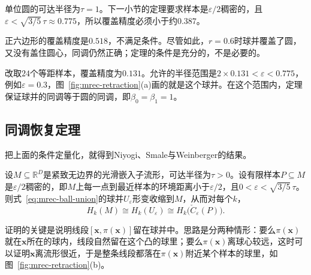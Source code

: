 单位圆的可达半径为$\tau=1$。下一小节的定理要求样本是$\varepsilon/2$稠密的，且$\varepsilon<\sqrt{3/5}\,\tau\approx0.775$，所以覆盖精度必须小于约$0.387$。

正六边形的覆盖精度是$0.518$，不满足条件。尽管如此，$r=0.6$时球并覆盖了圆，又没有盖住圆心，同调仍然正确；定理的条件是充分的，不是必要的。

改取$24$个等距样本，覆盖精度为$0.131$。允许的半径范围是$2\times0.131<\varepsilon<0.775$，例如$\varepsilon=0.3$，图~\ref{fig:mrec-retraction}(a)画的就是这个球并。在这个范围内，定理保证球并的同调等于圆的同调，即$\beta_0=\beta_1=1$。

\subsection{同调恢复定理}
\label{sec:mrec-homology-theorem}

把上面的条件定量化，就得到Niyogi、Smale与Weinberger的结果。

\begin{theorem}[有限样本的同调恢复]
\label{thm:mrec-homology-recovery}
设$M\subseteq\mathbb R^D$是紧致无边界的光滑嵌入子流形，可达半径为$\tau>0$。设有限样本$P\subseteq M$是$\varepsilon/2$稠密的，即$M$上每一点到最近样本的环境距离小于$\varepsilon/2$，且$0<\varepsilon<\sqrt{3/5}\,\tau$。则式~\eqref{eq:mrec-ball-union}的球并$U_\varepsilon$形变收缩到$M$，从而对每个$k$，
\begin{equation}
 H_k(M)\cong H_k(U_\varepsilon)\cong H_k\bigl(\check C_\varepsilon(P)\bigr).
 \label{eq:mrec-homology-recovery}
\end{equation}
\end{theorem}

证明的关键是说明线段$[\bm x,\pi(\bm x)]$留在球并中。思路是分两种情形：要么$\pi(\bm x)$就在$\bm x$所在的球内，线段自然留在这个凸的球里；要么$\pi(\bm x)$离球心较远，这时可以证明$\bm x$离流形很近，于是整条线段都落在$\pi(\bm x)$附近某个样本的球里，如图~\ref{fig:mrec-retraction}(b)。

